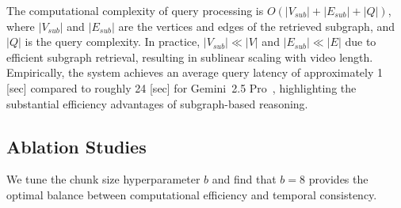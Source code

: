The computational complexity of query processing is $O(|V_{sub}| + |E_{sub}| + |Q|)$, where $|V_{sub}|$ and $|E_{sub}|$ are the vertices and edges of the retrieved subgraph, and $|Q|$ is the query complexity.
In practice, $|V_{sub}| \ll |V|$ and $|E_{sub}| \ll |E|$ due to efficient subgraph retrieval, resulting in sublinear scaling with video length. Empirically, the system achieves an average query latency of approximately 1 [sec] compared to roughly 24 [sec] for Gemini~2.5 Pro~\cite{comanici2025gemini}, highlighting the substantial efficiency advantages of subgraph-based reasoning.

\subsection{Ablation Studies}
We tune the chunk size hyperparameter $b$ and find that $b = 8$ provides the optimal balance between computational efficiency and temporal consistency.


